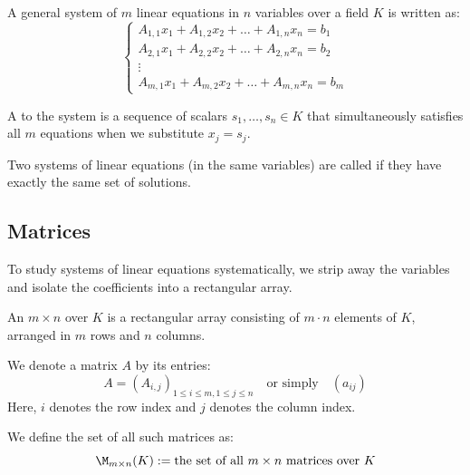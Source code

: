 \begin{definition}
A general system of $m$ linear equations in $n$ variables over a field $K$ is written as:
\begin{equation} \label{eq:general_system}
\begin{cases}
A_{1,1}x_1 + A_{1,2}x_2 + \dots + A_{1,n}x_n = b_1 \\
A_{2,1}x_1 + A_{2,2}x_2 + \dots + A_{2,n}x_n = b_2 \\
\vdots \\
A_{m,1}x_1 + A_{m,2}x_2 + \dots + A_{m,n}x_n = b_m
\end{cases}
\end{equation}
\end{definition}

\begin{definition}[Solution]
A  to the system is a sequence of scalars $s_1, \dots, s_n \in K$ that simultaneously satisfies all $m$ equations when we substitute $x_j = s_j$.
\end{definition}

\begin{definition}[Equivalence]
Two systems of linear equations (in the same variables) are called  if they have exactly the same set of solutions.
\end{definition}

\subsection{Matrices}

To study systems of linear equations systematically, we strip away the variables and isolate the coefficients into a rectangular array.

\begin{definition}[Matrix]
An $m \times n$  over $K$ is a rectangular array consisting of $m \cdot n$ elements of $K$, arranged in $m$ rows and $n$ columns.
\end{definition}

\begin{notation}
We denote a matrix $A$ by its entries:
\[
A = (A_{i,j})_{1 \le i \le m, 1 \le j \le n} \quad \text{or simply} \quad (a_{ij})
\]
Here, $i$ denotes the row index and $j$ denotes the column index.
\end{notation}

We define the set of all such matrices as:
\begin{equation*}
    \M_{m \times n}(K) := \text{the set of all } m \times n \text{ matrices over } K
\end{equation*}

